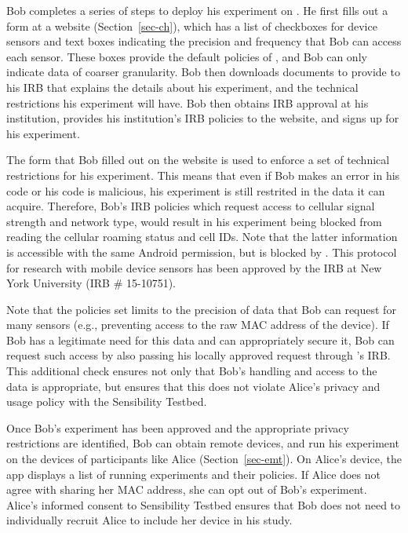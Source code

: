 Bob completes a series of steps to deploy his experiment on \sysname.
He first fills out a form at a \sysname website 
(Section~\ref{sec-ch}), which has a list of checkboxes for device sensors 
and text boxes indicating the precision and frequency that Bob can access 
each sensor. These boxes provide the default policies of \sysname, and 
Bob can only indicate data of coarser granularity. 
Bob then downloads 
documents to provide to his IRB that 
explains the details about his experiment, \sysname and the technical 
restrictions his experiment will have. Bob then obtains IRB approval at 
his institution, provides his institution's IRB policies to the 
\sysname website, and signs up for his experiment. 

The form that Bob filled out on the \sysname website is used to
enforce a set of technical restrictions for his experiment.  This means
that even if Bob makes an error in his code or his code is malicious, his 
experiment is still restrited in the data it can acquire. 
 Therefore, Bob's IRB 
policies which request access to cellular signal strength and network type, would result 
in his experiment being blocked from reading the cellular roaming status and cell 
IDs. Note that the latter information is accessible with the same 
Android permission, but is blocked by \sysname.  This
protocol for research with mobile device sensors has been approved by
the IRB at New York University (IRB \# 15-10751).  

Note that the policies set limits to the precision of data that Bob can request
for many sensors (e.g., preventing access to the raw MAC address of the device).
If Bob has a legitimate need for this data and can appropriately secure it,
Bob can request such access by also passing his locally approved request 
through \sysname's IRB.  This additional check ensures not only that Bob's 
handling and access to the data is appropriate, but ensures that this does
not violate Alice's privacy and usage policy with the Sensibility Testbed.

Once Bob's experiment has been approved and the appropriate privacy
restrictions are identified, Bob can obtain remote devices, and run his experiment on the
devices of participants like Alice (Section~\ref{sec-emt}). On Alice's device, the app displays a 
list of running experiments and their policies. If Alice does not agree with
sharing her MAC address, she can opt out of Bob's experiment. 
Alice's informed consent to Sensibility Testbed
ensures that Bob does not need to individually recruit Alice to include
her device in his study.

